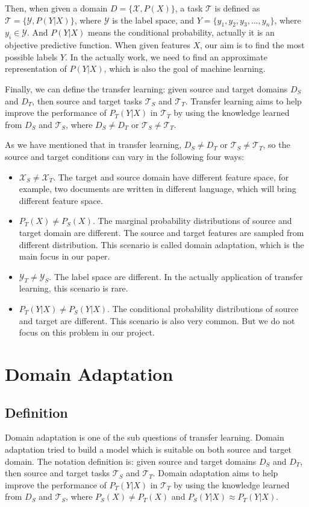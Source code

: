 \documentclass{kththesis}
\begin{document}
\noindent Then, when given a domain $D = \{\mathcal{X}, P(X)\}$, a task $\mathcal{T}$ is defined as $\mathcal{T} = \{\mathcal{Y},P(Y|X)\}$, where $\mathcal{Y}$ is the label space, and $Y = \{y_1,y_2,y_3,...,y_n\}$, where $y_i \in \mathcal{Y}$. And $P(Y|X)$ means the conditional probability, actually it is an objective predictive function. When given features $X$, our aim is to find the most possible labels $Y$. In the actually work, we need to find an approximate representation of $P(Y|X)$, which is also the goal of machine learning.

\noindent Finally, we can define the transfer learning: given source and target domains $D_S$ and $D_T$, then source and target tasks $\mathcal{T}_S$ and $\mathcal{T}_T$. Transfer learning aims to help improve the performance of $P_T(Y|X)$ in $\mathcal{T}_T$ by using the knowledge learned from $D_S$ and $\mathcal{T}_S$, where $D_S \neq D_T$ or $\mathcal{T}_S \neq \mathcal{T}_T$.

\noindent As we have mentioned that in transfer learning, $D_S \neq D_T$ or $\mathcal{T}_S \neq \mathcal{T}_T$, so the source and target conditions can vary in the following four ways:
\begin{itemize}
    \item $\mathcal{X}_S \neq \mathcal{X}_T$. The target and source domain have different feature space, for example, two documents are written in different language, which will bring different feature space. 
    \item $P_T(X) \neq P_S(X)$. The marginal probability distributions of source and target domain are different. The source and target features are sampled from different distribution. This scenario is called domain adaptation, which is the main focus in our paper. 
    \item $\mathcal{Y}_T \neq \mathcal{Y}_S$. The label space are different. In the actually application of transfer learning, this scenario is rare. 
    \item $P_T(Y|X) \neq P_S(Y|X)$. The conditional probability distributions of source and target are different. This scenario is also very common. But we do not focus on this problem in our project.
\end{itemize}

\section{Domain Adaptation}
\subsection{Definition}
Domain adaptation is one of the sub questions of transfer learning. Domain adaptation tried to build a model which is suitable on both source and target domain. The notation definition is:  given source and target domains $D_S$ and $D_T$, then source and target tasks $\mathcal{T}_S$ and $\mathcal{T}_T$. Domain adaptation aims to help improve the performance of $P_T(Y|X)$ in $\mathcal{T}_T$ by using the knowledge learned from $D_S$ and $\mathcal{T}_S$, where $P_S(X) \neq P_T(X)$ and $P_S(Y|X) \approx P_T(Y|X)$.
\end{document}
